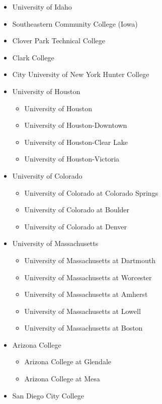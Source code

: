 \documentclass[
]{article}
\providecommand{\tightlist}{%
  \setlength{\itemsep}{0pt}\setlength{\parskip}{0pt}}
\begin{document}
\begin{itemize}
\tightlist
\item
  University of Idaho
\item
  Southeastern Community College (Iowa)
\item
  Clover Park Technical College
\item
  Clark College
\item
  City University of New York Hunter College
\item
  University of Houston

  \begin{itemize}
  \tightlist
  \item
    University of Houston
  \item
    University of Houston-Downtown
  \item
    University of Houston-Clear Lake
  \item
    University of Houston-Victoria
  \end{itemize}
\item
  University of Colorado

  \begin{itemize}
  \tightlist
  \item
    University of Colorado at Colorado Springs
  \item
    University of Colorado at Boulder
  \item
    University of Colorado at Denver
  \end{itemize}
\item
  University of Massachusetts

  \begin{itemize}
  \tightlist
  \item
    University of Massachusetts at Dartmouth
  \item
    University of Massachusetts at Worcester
  \item
    University of Massachusetts at Amherst
  \item
    University of Massachusetts at Lowell
  \item
    University of Massachusetts at Boston
  \end{itemize}
\item
  Arizona College

  \begin{itemize}
  \tightlist
  \item
    Arizona College at Glendale
  \item
    Arizona College at Mesa
  \end{itemize}
\item
  San Diego City College
\end{itemize}
\end{document}
